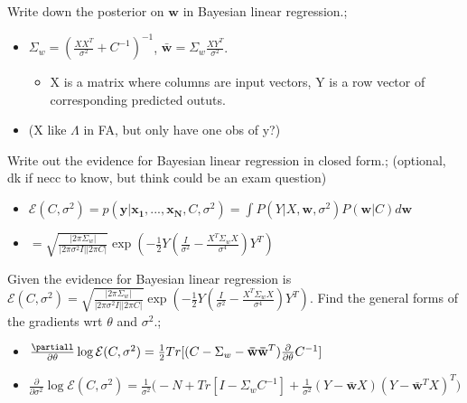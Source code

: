 \documentclass{article}
\begin{document}
Write down the posterior on $\mathbf{w}$ in Bayesian linear regression.; \begin{itemize}
    \item $\Sigma_w = (\frac{XX^T}{\sigma^2}+C^{-1})^{-1}$, $\mathbf{\bar{w}}=\Sigma_w\frac{XY^T}{\sigma^2}$.
    \begin{itemize}
        \item X is a matrix where columns are input vectors, Y is a row vector of corresponding predicted oututs.
    \end{itemize}
    \item (X like $\Lambda$ in FA, but only have one obs of y?)
\end{itemize}

Write out the evidence for Bayesian linear regression in closed form.; (optional, dk if necc to know, but think could be an exam question) \begin{itemize}
    \item $\mathcal{E}(C,\sigma^2)=p(\mathbf{y|x_1,...,x_N}, C, \sigma^2)=\int P(Y|X, \mathbf{w}, \sigma^2)P(\mathbf{w}|C)d\mathbf{w}$
    \item $=\sqrt{\frac{|2\pi\Sigma_w|}{|2\pi\sigma^2I||2\pi C|}}\exp(-\frac{1}{2}Y(\frac{I}{\sigma^2}-\frac{X^T\Sigma_w X}{\sigma^4})Y^T)$
\end{itemize}

Given the evidence for Bayesian linear regression is $\mathcal{E}(C,\sigma^2)=\sqrt{\frac{|2\pi\Sigma_w|}{|2\pi\sigma^2I||2\pi C|}}\exp(-\frac{1}{2}Y(\frac{I}{\sigma^2}-\frac{X^T\Sigma_w X}{\sigma^4})Y^T)$. Find the general forms of the gradients wrt $\theta$ and $\sigma^2$.; \begin{itemize}
    \item $\frac{\partiall}{\partial\theta}\log\mathcal{E}(C,\sigma^2)=\frac{1}{2}Tr[(C-\Sigma_w-\mathbf{\bar{w}\bar{w}}^T)\frac{\partial}{\partial\theta}C^{-1}]$
    \item $\frac{\partial}{\partial\sigma^2}\log\mathcal{E}(C,\sigma^2)=\frac{1}{\sigma^2}\big(-N+Tr[I-\Sigma_wC^{-1}]+\frac{1}{\sigma^2}(Y-\mathbf{\bar{w}}X)(Y-\mathbf{\bar{w}}^TX)^T\big )$
\end{itemize}
\end{document}
